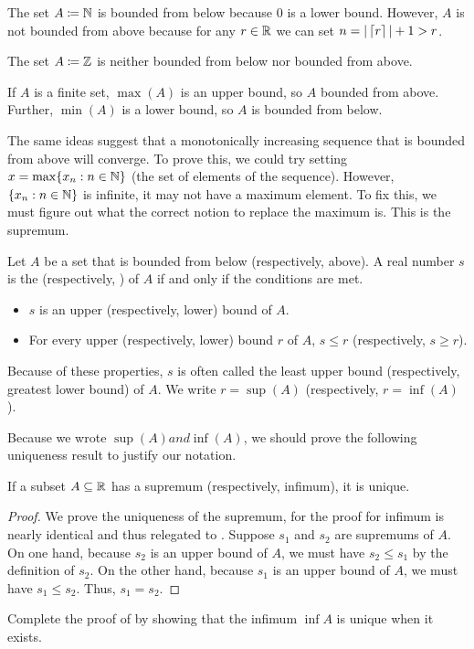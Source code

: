 \documentclass[../notes.tex]{subfiles}
\begin{document}
\begin{example}
    \begin{listalph}
        \item The set $A\coloneqq\mathbb N$ is bounded from below because $0$ is a lower bound. However, $A$ is not bounded from above because for any $r\in \mathbb R$ we can set $n = |\left\lceil{r}\right\rceil| + 1 > r$. 
        \item The set $A\coloneqq\mathbb Z$ is neither bounded from below nor bounded from above.
        \item If $A$ is a finite set, $\max(A)$ is an upper bound, so $A$ bounded from above. Further, $\min(A)$ is a lower bound, so $A$ is bounded from below. 
    \end{listalph}
\end{example}
The same ideas suggest that a monotonically increasing sequence that is bounded from above will converge. To prove this, we could try setting $x=\max\{x_n : n\in \mathbb N\}$ (the set of elements of the sequence). However, $\{x_n : n\in \mathbb N\}$ is infinite, it may not have a maximum element. To fix this, we must figure out what the correct notion to replace the maximum is. This is the supremum.

\begin{definition} \label{def:sup-inf}
    Let $A$ be a set that is bounded from below (respectively, above). A real number $s$ is the  (respectively, ) of $A$ if and only if the conditions are met.
    \begin{itemize}
        \item $s$ is an upper (respectively, lower) bound of $A$.
        \item For every upper (respectively, lower) bound $r$ of $A$, $s\leq r$ (respectively, $s\geq r$).
    \end{itemize}
    Because of these properties, $s$ is often called the least upper bound (respectively, greatest lower bound) of $A$. We write $r=\sup(A)$ (respectively, $r=\inf(A)$). 
\end{definition}
Because we wrote $\sup(A) and \inf(A)$, we should prove the following uniqueness result to justify our notation.

\begin{proposition} \label{prop:sup-uniq}
    If a subset $A\subseteq\mathbb R$ has a supremum (respectively, infimum), it is unique.
\end{proposition}
\begin{proof}
    We prove the uniqueness of the supremum, for the proof for infimum is nearly identical and thus relegated to . Suppose $s_1$ and $s_2$ are supremums of $A$. On one hand, because $s_2$ is an upper bound of $A$, we must have $s_2\leq s_1$ by the definition of $s_2$. On the other hand, because $s_1$ is an upper bound of $A$, we must have $s_1\leq s_2$. Thus, $s_1=s_2$. 
\end{proof}
\begin{exercise} \label{exe:inf-uniq}
    Complete the proof of  by showing that the infimum $\inf A$ is unique when it exists.
\end{exercise}
\end{document}
